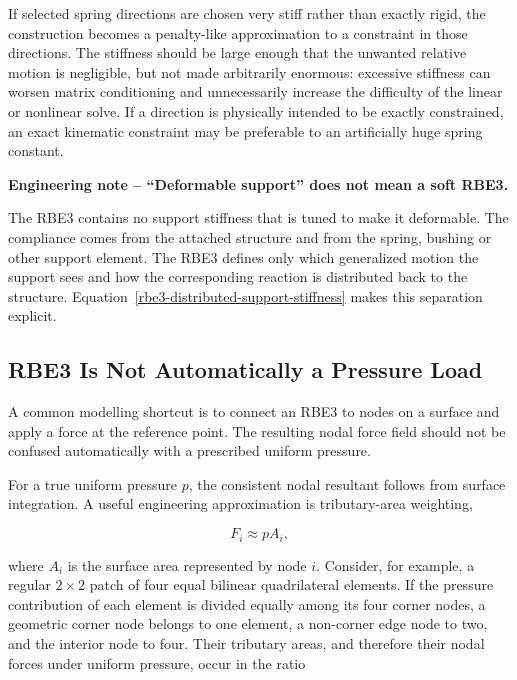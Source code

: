 If selected spring directions are chosen very stiff rather than exactly rigid,
the construction becomes a penalty-like approximation to a constraint in those
directions. The stiffness should be large enough that the unwanted relative
motion is negligible, but not made arbitrarily enormous: excessive stiffness can
worsen matrix conditioning and unnecessarily increase the difficulty of the
linear or nonlinear solve. If a direction is physically intended to be exactly
constrained, an exact kinematic constraint may be preferable to an artificially
huge spring constant.

\begin{bbox}
\textbf{Engineering note -- ``Deformable support'' does not mean a soft RBE3.}

The RBE3 contains no support stiffness that is tuned to make it deformable. The
compliance comes from the attached structure and from the spring, bushing or
other support element. The RBE3 defines only which generalized motion the
support sees and how the corresponding reaction is distributed back to the
structure. Equation~\eqref{rbe3-distributed-support-stiffness} makes this
separation explicit.
\end{bbox}

\subsection{RBE3 Is Not Automatically a Pressure Load}

A common modelling shortcut is to connect an RBE3 to nodes on a surface and
apply a force at the reference point. The resulting nodal force field should not
be confused automatically with a prescribed uniform pressure.

For a true uniform pressure $p$, the consistent nodal resultant follows from
surface integration. A useful engineering approximation is tributary-area
weighting,

\begin{equation}\label{rbe3-tributary-weight}
    F_i\approx pA_i,
\end{equation}

where $A_i$ is the surface area represented by node $i$. Consider, for example,
a regular $2\times2$ patch of four equal bilinear quadrilateral elements. If the
pressure contribution of each element is divided equally among its four corner
nodes, a geometric corner node belongs to one element, a non-corner edge node
to two, and the interior node to four. Their tributary areas, and therefore
their nodal forces under uniform pressure, occur in the ratio

